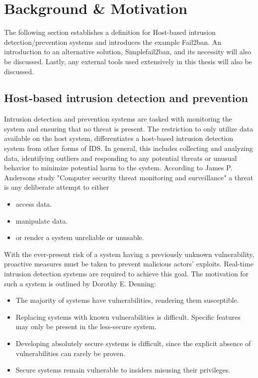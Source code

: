 %
%

\chapter{Background \& Motivation}
\label{cha:background}
The following section establishes a definition for Host-based intrusion detection/prevention systems and introduces the example Fail2ban.
An introduction to an alternative solution, Simplefail2ban, and its necessity will also be discussed.
Lastly, any external tools used extensively in this thesis will also be discussed. 

\section{Host-based intrusion detection and prevention}
Intrusion detection and prevention systems are tasked with monitoring the system and ensuring that no threat is present.
The restriction to only utilize data available on the host system, differentiates a host-based intrusion detection system from other forms of \ac{IDS}.
In general, this includes collecting and analyzing data, identifying outliers and responding to any potential threats or unusual behavior to minimize potential harm to the system.
According to James P. Andersons study "Computer security threat monitoring and surveillance"\cite{anderson:compSec} a threat is any deliberate attempt to either
\begin{itemize}
    \itemsep0em
    \item access data.
    \item manipulate data.
    \item or render a system unreliable or unusable.
\end{itemize}

With the ever-present risk of a system having a previously unknown vulnerability, proactive measures must be taken to prevent malicious actors' exploits.
Real-time intrusion detection systems are required to achieve this goal.
The motivation for such a system is outlined by Dorothy E. Denning\cite{denning:IntrusionModel}:
\begin{itemize}
    \itemsep0em
    \item The majority of systems have vulnerabilities, rendering them susceptible. 
    \item Replacing systems with known vulnerabilities is difficult. Specific features may only be present in the less-secure system.
    \item Developing absolutely secure systems is difficult, since the explicit absence of vulnerabilities can rarely be proven.
    \item Secure systems remain vulnerable to insiders misusing their privileges.
\end{itemize}


